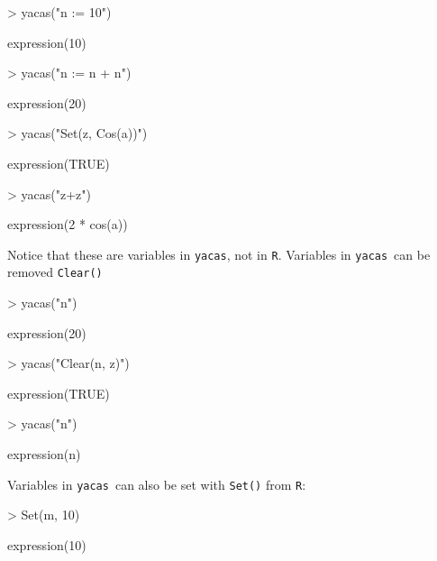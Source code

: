 \documentclass[10pt]{article}
\newcommand{\yacas}{{\tt yacas}}
\newcommand{\code}[1]{{\tt #1}}
\def\R{\texttt{R}}
\begin{document}
\begin{Schunk}
\begin{Sinput}
> yacas("n := 10")
\end{Sinput}
\begin{Soutput}
expression(10)
\end{Soutput}
\begin{Sinput}
> yacas("n := n + n")
\end{Sinput}
\begin{Soutput}
expression(20)
\end{Soutput}
\begin{Sinput}
> yacas("Set(z, Cos(a))")
\end{Sinput}
\begin{Soutput}
expression(TRUE)
\end{Soutput}
\begin{Sinput}
> yacas("z+z")
\end{Sinput}
\begin{Soutput}
expression(2 * cos(a))
\end{Soutput}
\end{Schunk}

Notice that these are variables in \yacas, not in \R.
Variables in \yacas\ can be removed \code{Clear()}
\begin{Schunk}
\begin{Sinput}
> yacas("n")
\end{Sinput}
\begin{Soutput}
expression(20)
\end{Soutput}
\begin{Sinput}
> yacas("Clear(n, z)")
\end{Sinput}
\begin{Soutput}
expression(TRUE)
\end{Soutput}
\begin{Sinput}
> yacas("n")
\end{Sinput}
\begin{Soutput}
expression(n)
\end{Soutput}
\end{Schunk}

Variables in \yacas\ can also be set with \code{Set()} from \R:
\begin{Schunk}
\begin{Sinput}
> Set(m, 10)
\end{Sinput}
\begin{Soutput}
expression(10)
\end{Soutput}
\end{Schunk}
\end{document}
